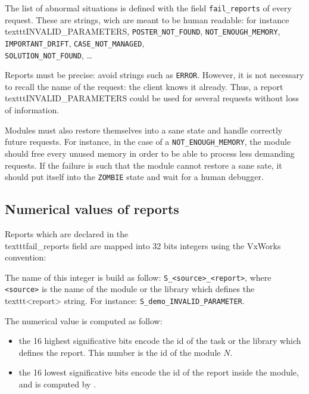 The list of abnormal situations is defined with the field \texttt{fail\_reports}
of every   request.  These   are strings,   wich are   meant to be  human
readable:       for      instance  \\texttt{INVALID\_PARAMETERS},   
\texttt{POSTER\_NOT\_FOUND}, \texttt{NOT\_ENOUGH\_MEMORY},   \texttt{IMPORTANT\_DRIFT},
\texttt{CASE\_NOT\_MANAGED},\\ \texttt{SOLUTION\_NOT\_FOUND}, \ldots

Reports must be precise:  avoid strings such  as \texttt{ERROR}. However, it
is not necessary to recall the name  of the request:  the client knows it
already.  Thus, a  report \\texttt{INVALID\_PARAMETERS}   could be used  for
several requests without loss of information.

Modules must  also   restore  themselves into  a  sane  state  and handle
correctly future   requests.   For  instance, in  the   case  of  a  
\texttt{NOT\_ENOUGH\_MEMORY}, the module should free every unused memory in order
to be able to process  less demanding requests.  If  the failure is  such
that the module cannot restore a sane sate, it should put itself into the
\texttt{ZOMBIE} state and wait for a human debugger.


\subsection{Numerical values of reports}

Reports which  are declared in the \\texttt{fail\_reports} field are mapped into
32 bits integers using the VxWorks convention:

The name of this integer is build as follow: \texttt{S\_<source>\_<report>},
where \texttt{<source>} is the name of the module or the library which defines
the      \\texttt{<report>}     string.    For       instance:     
\texttt{S\_demo\_INVALID\_PARAMETER}.

The numerical value is computed as follow:
\begin{itemize}
\item the 16 highest significative bits encode the id of the task or
the  library which  defines the report.   This  number is  the  id of the
module  $N$.

\item the 16 lowest significative bits encode the id of the report
inside the module, and is computed by \GenoM.
\end{itemize}

